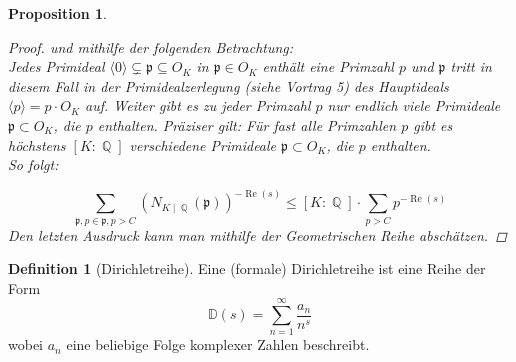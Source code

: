 \documentclass[10pt,a4paper]{article}
\theoremstyle{plain}
\newtheorem{prop}[thm]{Proposition}
\theoremstyle{definition}
\newtheorem{defn}{Definition}[section]
\theoremstyle{remark}
\DeclareMathOperator{\Q}{\mathbb{Q}}
\DeclareMathOperator{\re}{Re}
\begin{document}
\begin{prop}
\begin{proof}
und mithilfe der folgenden Betrachtung: \\Jedes Primideal $\langle0\rangle\subsetneq \mathfrak{p} \subseteq O_{\textit{K}}$ in $\mathfrak{p} \in O_K$ enthält eine Primzahl $p$ und $\mathfrak{p}$ tritt in diesem Fall in der Primidealzerlegung (siehe Vortrag 5) des Hauptideals $\langle p \rangle=p\cdot O_K$ auf. Weiter gibt es zu jeder Primzahl $p$ nur endlich viele Primideale $\mathfrak{p}\subset O_K$, die $p$ enthalten. Präziser gilt: Für fast alle Primzahlen $p$ gibt es höchstens $[K\colon \Q]$ verschiedene Primideale $\mathfrak{p}\subset O_K$, die $p$ enthalten. 
\\
So folgt:

$$\sum_{\mathfrak{p},p\in \mathfrak{p},p>C}(N_{K\mid \Q}(\mathfrak{p}))^{-\re(s)} \leq [K\colon\Q]\cdot \sum_{p>C}p^{-\re(s)} $$Den letzten Ausdruck kann man mithilfe der Geometrischen Reihe abschätzen.
\end{proof}
\end{prop}


\begin{defn}[Dirichletreihe]

Eine (formale) Dirichletreihe ist eine Reihe der Form $$\mathbb{D}(s) = \sum_{n =1}^{\infty}\frac{a_n}{n^s} $$ wobei $a_n$ eine beliebige Folge komplexer Zahlen beschreibt.

\end{defn}
\end{document}
